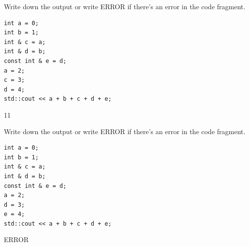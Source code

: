 \nextq
Write down the output or write ERROR if there's an error in the
code fragment.
\begin{Verbatim}[frame=single,fontsize=\footnotesize]
int a = 0;
int b = 1;
int & c = a;
int & d = b;
const int & e = d;
a = 2;
c = 3;
d = 4;
std::cout << a + b + c + d + e;
\end{Verbatim}
\ANSWER
\begin{answercode}
11
\end{answercode}

\nextq
Write down the output or write ERROR if there's an error in the
code fragment.
\begin{Verbatim}[frame=single,fontsize=\footnotesize]
int a = 0;
int b = 1;
int & c = a;
int & d = b;
const int & e = d;
a = 2;
d = 3;
e = 4;
std::cout << a + b + c + d + e;
\end{Verbatim}
\ANSWER
\begin{answercode}
ERROR
\end{answercode}


